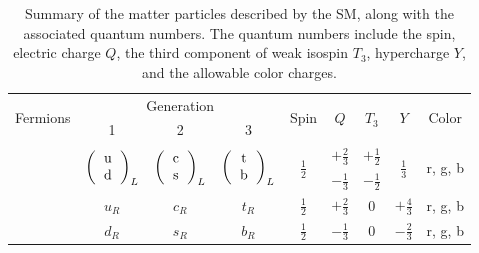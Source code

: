 \begin{table}
  \caption{Summary of the matter particles described by the SM, along with the
    associated quantum numbers.
    The quantum numbers include the spin, electric charge $Q$, the third
    component of weak isospin $T_3$, hypercharge $Y$, and the allowable color
    charges.
  }
  \label{tab:sm_matter_content}
  \begin{center}
    \begin{tabular}{ccccccccc}
      \toprule
      \multirow{2}{*}{Fermions} &
      \multicolumn{3}{c}{Generation} &
      \multirow{2}{*}{Spin} &
      \multirow{2}{*}{$Q$} &
      \multirow{2}{*}{$T_3$} &
      \multirow{2}{*}{$Y$} &
      \multirow{2}{*}{Color}
      \\[1ex]
      & 1 & 2 & 3
      \\
      \midrule
      \addlinespace[1ex]
      \multirow{5}{*}{Quarks} &
      \multirow{2}{*}{$\left(
        \begin{tabular}{c} u \\ d \end{tabular} \right)_{L}$ } & %
      \multirow{2}{*}{$\left(
        \begin{tabular}{c} c \\ s \end{tabular} \right)_{L}$ } & %
      \multirow{2}{*}{$\left(
        \begin{tabular}{c} t \\ b \end{tabular} \right)_{L}$ } & %
      \multirow{2}{*}{$\frac{1}{2}$} & %
      $+\frac{2}{3}$ & %
      $+\frac{1}{2}$ & %
      \multirow{2}{*}{$\frac{1}{3}$} & %
      \multirow{2}{*}{r, g, b} %
      \\[1ex]
      & %
      & %
      & %
      & %
      & %
      $-\frac{1}{3}$ & %
      $-\frac{1}{2}$ & %
      & %
      \\
      \cmidrule{2-9}
      &
      $u_R$ &
      $c_R$ &
      $t_R$ &
      $\frac{1}{2}$ & %
      $+\frac{2}{3}$ & %
      0 & %
      $+\frac{4}{3}$ & %
      r, g, b %
      \\[1ex]
      &
      $d_R$ &
      $s_R$ &
      $b_R$ &
      $\frac{1}{2}$ & %
      $-\frac{1}{3}$ & %
      0 & %
      $-\frac{2}{3}$ & %
      r, g, b %
      \\
      \midrule

\end{tabular}
\end{center}
\end{table}
